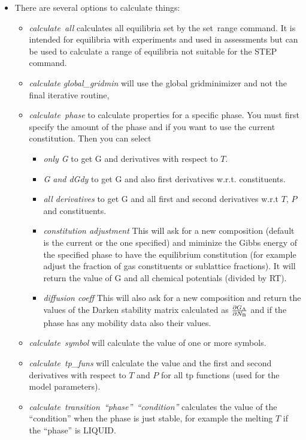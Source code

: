 \documentclass[12pt]{article}
\begin{document}
\begin{itemize}
\item There are several options to calculate things:
  \begin{itemize}
  \item {\em calculate~all} calculates all equilibria set by the {\rm
    set~range} command.  It is intended for equilibria with
    experiments and used in assessments but can be used to calculate a
    range of equilibria not suitable for the STEP command.
  \item {\em calculate global\_gridmin} will use the global
    gridminimizer and not the final iterative routine,
  \item {\em calculate~phase} to calculate properties for a specific phase.
    You must first specify the amount of the phase and if you want to
    use the current constitution.  Then you can select
    \begin{itemize}
    \item {\em only G} to get G and derivatives with respect to $T$.
    \item {\em G and dGdy} to get G and also first derivatives
      w.r.t. constituents.
    \item {\em all derivatives} to get G and all first and second
      derivatives w.r.t $T$, $P$ and constituents.
    \item {\em constitution adjustment} This will ask for a new
      composition (default is the current or the one specified) and
      miminize the Gibbs energy of the specified phase to have the
      equilibrium constitution (for example adjust the fraction of gas
      constituents or sublattice fractions).  It will return the value
      of G and all chemical potentials (divided by RT).
    \item {\em diffusion coeff} This will also ask for a new
      composition and return the values of the Darken stability matrix
      calculated as $\frac{\partial G_{\rm A}}{\partial N_{\rm B}}$
      and if the phase has any mobility data also their values.
    \end{itemize}
  \item {\em calculate~symbol} will calculate the value of one or more
    symbols.
  \item {\em calculate~tp\_funs} will calculate the value and the
    first and second derivatives with respect to $T$ and $P$ for all
    tp functions (used for the model parameters).
  \item {\em calculate~transition~``phase''~``condition''} calculates
    the value of the ``condition'' when the phase is just stable, for
    example the melting $T$ if the ``phase'' is LIQUID.
  \end{itemize}
\end{itemize}
\end{document}

